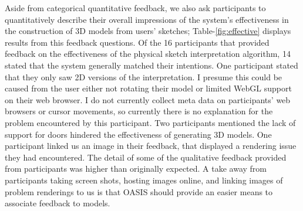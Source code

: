 Aside from categorical quantitative feedback, we also ask participants to quantitatively describe their overall impressions of the system's effectiveness in the construction of 3D models from users' sketches; Table-\ref{fig:effective} displays results from this feedback questions.  Of the 16 participants that provided feedback on the effectiveness of the physical sketch interpretation algorithm, 14 stated that the system generally matched their intentions.  One participant stated that they only saw 2D versions of the interpretation.  I presume this could be caused from the user either not rotating their model or limited WebGL support on their web browser.  I do  not currently collect meta data on participants' web browsers or cursor movements, so currently there is no explanation for the problem encountered by this participant.  Two participants mentioned the lack of support for doors hindered the effectiveness of generating 3D models.  One participant linked us an image in their feedback, that displayed a rendering issue they had encountered.  The detail of some of the qualitative feedback provided from participants was higher than originally expected.  A take away from participants taking screen shots, hosting images online, and linking images of problem renderings to us is that OASIS should provide an easier means to associate feedback to models.  \\


